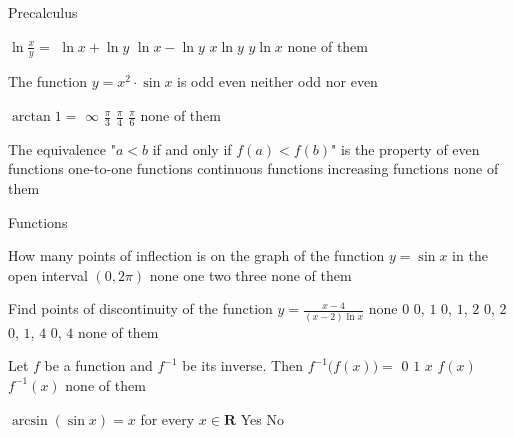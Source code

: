 \documentclass{article}
\begin{document}
\SetGameHeight{0.4\textheight}
\CellHeight




\MakeGameBoard

\begin{category}{Precalculus}

\begin{question}
$\ln \frac xy=$
 $\ln x+\ln y$
 $\ln x-\ln y$
 $x\ln y$
 $y\ln x$
 none of them
\end{question}

\begin{question}
The function $y=x^2\cdot \sin x$ is
 odd
 even
 neither odd nor even
\end{question}

\begin{question}
$\arctan 1=$
 $\infty$ 
 $\frac \pi3$
 $\frac \pi4$
 $\frac \pi6$
 none of them
\end{question}

\begin{question}
The equivalence "$a<b$ if and only if $f(a)<f(b)$" is the property of
 even functions
 one-to-one functions
 continuous functions
 increasing functions
 none of them
\end{question}

\end{category}


\begin{category}{Functions}

\begin{question}
How many points of inflection is on the graph of the function $y=\sin x$ in
the open interval $(0,2\pi)$
 none
 one
 two
 three
 none of them
\end{question}

\begin{question}
Find points of discontinuity of the function $y=\frac {x-4}{(x-2)\ln x}$
 none
 $0$
 $0$, $1$
 $0$, $1$, $2$
 $0$, $2$
 $0$, $1$, $4$
 $0$, $4$
 none of them
\end{question}

\begin{question}
Let $f$ be a function and $f^{-1}$ be its inverse. Then $f^{-1}\bigl(f(x)\bigr)=$
 $0$
 $1$
 $x$
 $f(x)$
 $f^{-1}(x)$
 none of them
\end{question}

\begin{question}
$\arcsin(\sin x)=x$ for every $x\in\mathbf{R}$
 Yes
 No
\end{question}

\end{category}
\end{document}
